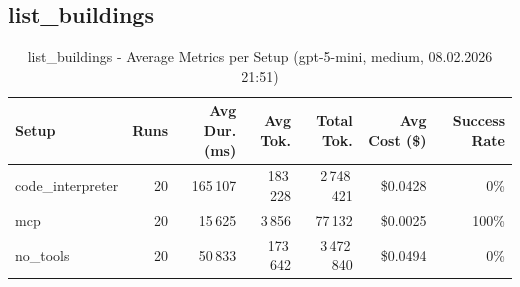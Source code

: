\documentclass[a4paper,11pt]{article}
\begin{document}
\clearpage

\subsection{list\_buildings}

\begin{table}[H]
\centering
\scriptsize
\caption{list\_buildings - Average Metrics per Setup (gpt-5-mini, medium, 08.02.2026 21:51)}
\label{tab:combined\_list\_buildings\_metrics\_20260208}
\begin{tabular}{l r r r r r r}
\toprule
Setup & Runs & Avg Dur. (ms) & Avg Tok. & Total Tok. & Avg Cost (\$) & Success Rate \\
\midrule
code\_interpreter & 20 & 165\,107 & 183\,228 & 2\,748\,421 & \$0.0428 & 0\% \\
mcp & 20 & 15\,625 & 3\,856 & 77\,132 & \$0.0025 & 100\% \\
no\_tools & 20 & 50\,833 & 173\,642 & 3\,472\,840 & \$0.0494 & 0\% \\
\bottomrule
\end{tabular}
\end{table}
\end{document}
